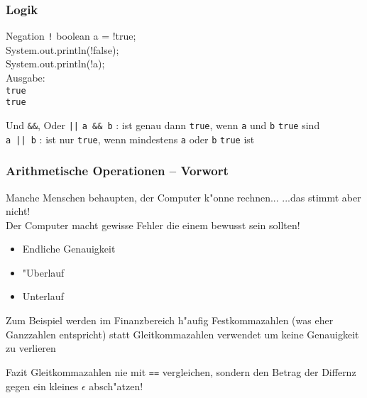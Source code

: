 \documentclass{beamer}
\begin{document}
\begin{frame}
\frametitle{Logik}
\begin{block}{Negation \texttt{!}}
{\ttfamily
boolean a = !true;\\
System.out.println(!false);\\
System.out.println(!a);\\[0.5em]
}Ausgabe:\pause\\
\texttt{true}\\
\texttt{true}
\end{block}

\pause

\begin{block}{Und \texttt{\&\&}, Oder \texttt{||}}
\texttt{a \&\& b} : ist genau dann \texttt{true}, wenn \texttt{a} und \texttt{b} \texttt{true} sind\\
\texttt{a || b} : ist nur \texttt{true}, wenn mindestens \texttt{a} oder \texttt{b} \texttt{true} ist
\end{block}
\end{frame}


\begin{frame}
\frametitle{Arithmetische Operationen -- Vorwort}
\begin{block}{Manche Menschen behaupten, der Computer k"onne rechnen...}\pause
\alert{...das stimmt aber nicht!}\pause\\
Der Computer macht gewisse Fehler die einem bewusst sein sollten!\pause\\
\begin{itemize}
\item Endliche Genauigkeit\\
\item "Uberlauf\\
\item Unterlauf
\end{itemize}
Zum Beispiel werden im Finanzbereich h"aufig Festkommazahlen (was eher Ganzzahlen entspricht) statt Gleitkommazahlen verwendet um keine Genauigkeit zu verlieren
\end{block}

\pause

\begin{block}{Fazit}
Gleitkommazahlen nie mit \texttt{==} vergleichen, sondern den Betrag der Differnz gegen ein kleines $\epsilon$ absch"atzen!
\end{block}
\end{frame}
\end{document}
